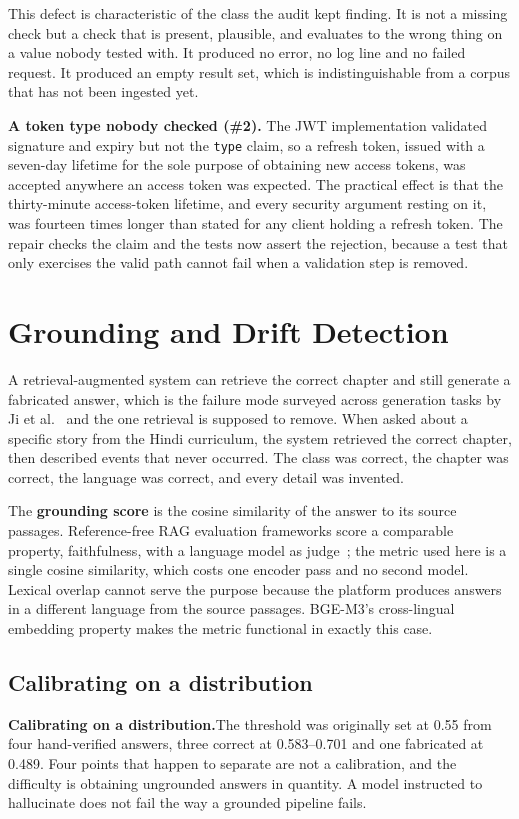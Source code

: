 This defect is characteristic of the class the audit kept finding. It is not a missing check but a check that is present, plausible, and evaluates to the wrong thing on a value nobody tested with. It produced no error, no log line and no failed request. It produced an empty result set, which is indistinguishable from a corpus that has not been ingested yet.

\textbf{A token type nobody checked (\#2).} The JWT implementation validated signature and expiry but not the \texttt{type} claim, so a refresh token, issued with a seven-day lifetime for the sole purpose of obtaining new access tokens, was accepted anywhere an access token was expected. The practical effect is that the thirty-minute access-token lifetime, and every security argument resting on it, was fourteen times longer than stated for any client holding a refresh token. The repair checks the claim and the tests now assert the rejection, because a test that only exercises the valid path cannot fail when a validation step is removed.

\fi
\section{Grounding and Drift Detection}
\label{sec:grounding}

A retrieval-augmented system can retrieve the correct chapter and still generate a fabricated answer, which is the failure mode surveyed across generation tasks by Ji et al.~\cite{b29} and the one retrieval is supposed to remove. When asked about a specific story from the Hindi curriculum, the system retrieved the correct chapter, then described events that never occurred. The class was correct, the chapter was correct, the language was correct, and every detail was invented.

The \textbf{grounding score} is the cosine similarity of the answer to its source passages. Reference-free RAG evaluation frameworks score a comparable property, faithfulness, with a language model as judge~\cite{b27}; the metric used here is a single cosine similarity, which costs one encoder pass and no second model. Lexical overlap cannot serve the purpose because the platform produces answers in a different language from the source passages. BGE-M3's cross-lingual embedding property makes the metric functional in exactly this case.

\ifspringer\subsection{Calibrating on a distribution}\else\textbf{Calibrating on a distribution.}\fi The threshold was originally set at 0.55 from four hand-verified answers, three correct at 0.583--0.701 and one fabricated at 0.489. Four points that happen to separate are not a calibration, and the difficulty is obtaining ungrounded answers in quantity. A model instructed to hallucinate does not fail the way a grounded pipeline fails.

